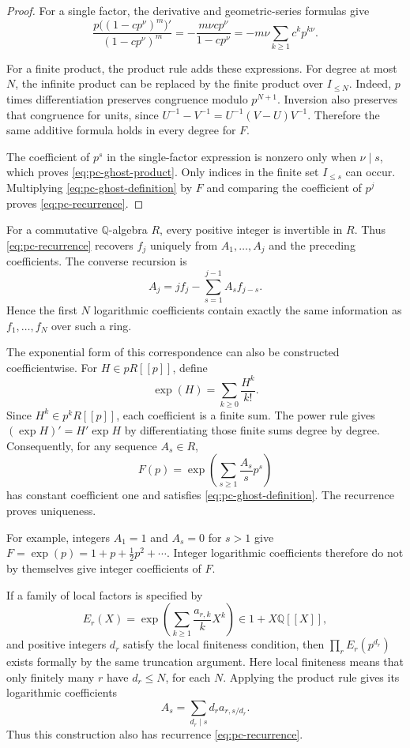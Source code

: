 \begin{proof}
For a single factor, the derivative and geometric-series formulas give
\[
 \frac{p\bigl((1-cp^\nu)^m\bigr)'}{(1-cp^\nu)^m}
   =-\frac{m\nu cp^\nu}{1-cp^\nu}
   =-m\nu\sum_{k\geq1}c^k p^{k\nu}.
\]

For a finite product, the product rule adds these expressions.
For degree at most $N$, the infinite product can be replaced by the
finite product over $I_{\leq N}$.
Indeed, $p$ times differentiation preserves congruence modulo $p^{N+1}$.
Inversion also preserves that congruence for units, since
$U^{-1}-V^{-1}=U^{-1}(V-U)V^{-1}$.
Therefore the same additive formula holds in every degree for $F$.

The coefficient of $p^s$ in the single-factor expression is nonzero only
when $\nu\mid s$, which proves \eqref{eq:pc-ghost-product}.
Only indices in the finite set $I_{\leq s}$ can occur.
Multiplying \eqref{eq:pc-ghost-definition} by $F$ and comparing the
coefficient of $p^j$ proves \eqref{eq:pc-recurrence}.
\end{proof}

For a commutative $\mathbb Q$-algebra $R$, every positive integer is
invertible in $R$. Thus \eqref{eq:pc-recurrence} recovers $f_j$ uniquely
from $A_1,\ldots,A_j$ and the preceding coefficients.
The converse recursion is
\[
 A_j=jf_j-\sum_{s=1}^{j-1}A_s f_{j-s}.
\]
Hence the first $N$ logarithmic coefficients contain exactly the same
information as $f_1,\ldots,f_N$ over such a ring.

The exponential form of this correspondence can also be constructed
coefficientwise. For $H\in pR[[p]]$, define
\[
 \exp(H)=\sum_{k\geq0}\frac{H^k}{k!}.
\]
Since $H^k\in p^kR[[p]]$, each coefficient is a finite sum.
The power rule gives $(\exp H)'=H'\exp H$ by differentiating those finite
sums degree by degree. Consequently, for any sequence $A_s\in R$,
\begin{equation}
 F(p)=\exp\left(\sum_{s\geq1}\frac{A_s}{s}p^s\right)
 \label{eq:pc-exponential}
\end{equation}
has constant coefficient one and satisfies
\eqref{eq:pc-ghost-definition}. The recurrence proves uniqueness.

For example, integers $A_1=1$ and $A_s=0$ for $s>1$ give
$F=\exp(p)=1+p+\tfrac12p^2+\cdots$. Integer logarithmic coefficients
therefore do not by themselves give integer coefficients of $F$.

If a family of local factors is specified by
\[
 E_r(X)=\exp\left(\sum_{k\geq1}\frac{a_{r,k}}{k}X^k\right)
 \in1+X\mathbb Q[[X]],
\]
and positive integers $d_r$ satisfy the local finiteness condition, then
$\prod_r E_r(p^{d_r})$ exists formally by the same truncation argument.
Here local finiteness means that only finitely many $r$ have $d_r\leq N$,
for each $N$. Applying the product rule gives its logarithmic coefficients
\[
 A_s=\sum_{d_r\mid s}d_r a_{r,s/d_r}.
\]
Thus this construction also has recurrence \eqref{eq:pc-recurrence}.

